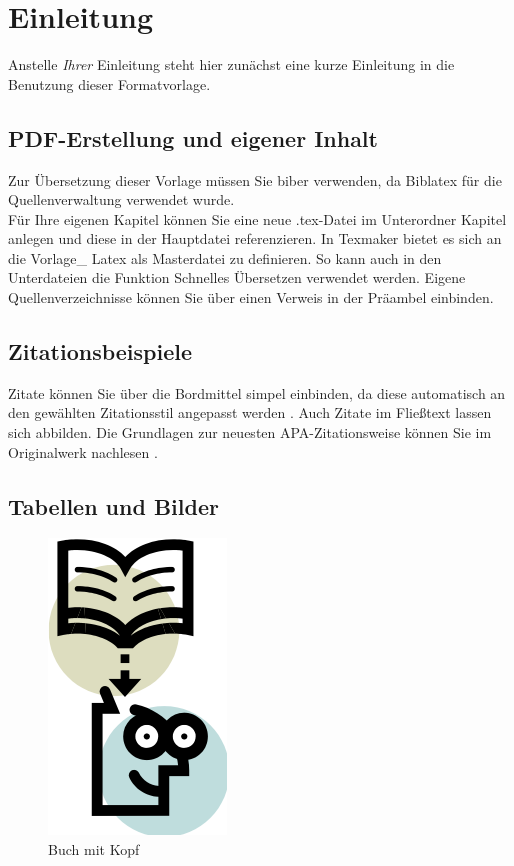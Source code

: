 \section{Einleitung}
Anstelle \textit{Ihrer} Einleitung steht hier zunächst eine kurze Einleitung in die Benutzung dieser Formatvorlage.

\subsection{PDF-Erstellung und eigener Inhalt}
Zur Übersetzung dieser Vorlage müssen Sie biber verwenden, da Biblatex für die Quellenverwaltung verwendet wurde. \\
Für Ihre eigenen Kapitel können Sie eine neue .tex-Datei im Unterordner Kapitel anlegen und diese in der Hauptdatei referenzieren. In Texmaker bietet es sich an die Vorlage\_ Latex als Masterdatei zu definieren. So kann auch in den Unterdateien die Funktion Schnelles Übersetzen verwendet werden.
Eigene Quellenverzeichnisse können Sie über einen Verweis in der Präambel einbinden.


\subsection{Zitationsbeispiele}
Zitate können Sie über die Bordmittel simpel einbinden, da diese automatisch an den gewählten Zitationsstil angepasst werden \parencite[5-8]{bergener_wissenschaftliches_2019}.
Auch Zitate im Fließtext \textcite{bergener_wissenschaftliches_2019} lassen sich abbilden. Die Grundlagen zur neuesten APA-Zitationsweise können Sie im Originalwerk nachlesen \parencite{apa_2019}.

\subsection{Tabellen und Bilder}

\begin{figure}[htbp] 
  \centering
     \includegraphics{Bilder/buchmitkopf.png}
  \caption[Buch mit Kopf]{Buch mit Kopf \parencite[1-2]{bergener_wissenschaftliches_2019}}
  \label{fig:Bild1}
\end{figure}

